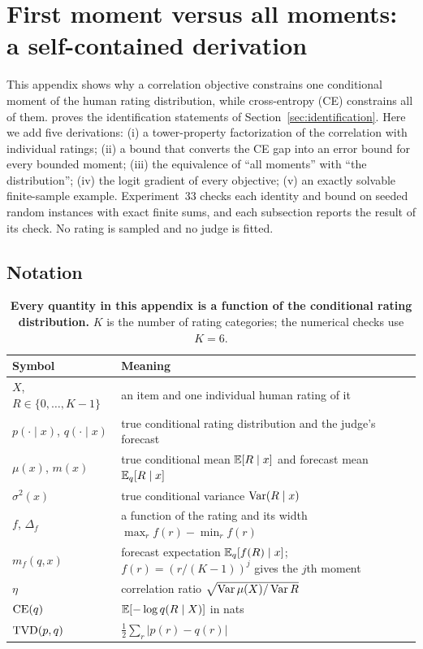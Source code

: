 \section{First moment versus all moments: a self-contained derivation}
\label{app:moments}

This appendix shows why a correlation objective constrains one conditional moment of the human rating distribution, while cross-entropy (CE) constrains all of them.
 proves the identification statements of Section~\ref{sec:identification}.
Here we add five derivations: (i) a tower-property factorization of the correlation with individual ratings; (ii) a bound that converts the CE gap into an error bound for every bounded moment; (iii) the equivalence of ``all moments'' with ``the distribution''; (iv) the logit gradient of every objective; (v) an exactly solvable finite-sample example.
Experiment~33 checks each identity and bound on seeded random instances with exact finite sums, and each subsection reports the result of its check.
No rating is sampled and no judge is fitted.

\subsection{Notation}
\label{app:moments-notation}

\begin{table}[h]
\caption{\textbf{Every quantity in this appendix is a function of the conditional rating distribution.}
$K$ is the number of rating categories; the numerical checks use $K=6$.}
\label{tab:notation}
\centering
\small
\begin{tabular}{@{}ll@{}}
\toprule
Symbol & Meaning \\
\midrule
$X$, $R\in\{0,\dots,K-1\}$ & an item and one individual human rating of it \\
$p(\cdot\mid x)$, $q(\cdot\mid x)$ & true conditional rating distribution and the judge's forecast \\
$\mu(x)$, $m(x)$ & true conditional mean $\mathbb{E}[R\mid x]$ and forecast mean $\mathbb{E}_q[R\mid x]$ \\
$\sigma^2(x)$ & true conditional variance $\operatorname{Var}(R\mid x)$ \\
$f$, $\Delta_f$ & a function of the rating and its width $\max_rf(r)-\min_rf(r)$ \\
$m_f(q,x)$ & forecast expectation $\mathbb{E}_q[f(R)\mid x]$; $f(r)=(r/(K-1))^j$ gives the $j$th moment \\
$\eta$ & correlation ratio $\sqrt{\operatorname{Var}\mu(X)/\operatorname{Var} R}$ \\
$\mathrm{CE}(q)$ & $\mathbb{E}[-\log q(R\mid X)]$ in nats \\
$\mathrm{TVD}(p,q)$ & $\tfrac12\sum_r|p(r)-q(r)|$ \\
\bottomrule
\end{tabular}
\end{table}

